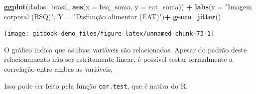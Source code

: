 \documentclass[
]{book}
\newenvironment{Shaded}{\begin{snugshade}}{\end{snugshade}}
\newcommand{\DataTypeTok}[1]{\textcolor[rgb]{0.13,0.29,0.53}{#1}}
\newcommand{\KeywordTok}[1]{\textcolor[rgb]{0.13,0.29,0.53}{\textbf{#1}}}
\newcommand{\NormalTok}[1]{#1}
\newcommand{\OperatorTok}[1]{\textcolor[rgb]{0.81,0.36,0.00}{\textbf{#1}}}
\newcommand{\StringTok}[1]{\textcolor[rgb]{0.31,0.60,0.02}{#1}}
\begin{document}
\begin{Shaded}
\begin{Highlighting}[]
\KeywordTok{ggplot}\NormalTok{(dados_brasil, }\KeywordTok{aes}\NormalTok{(}\DataTypeTok{x =}\NormalTok{ bsq_soma, }\DataTypeTok{y =}\NormalTok{ eat_soma)) }\OperatorTok{+}
\StringTok{  }\KeywordTok{labs}\NormalTok{(}\DataTypeTok{x =} \StringTok{"Imagem corporal (BSQ)"}\NormalTok{, }\DataTypeTok{Y =} \StringTok{"Disfunção alimentar (EAT)"}\NormalTok{)}\OperatorTok{+}
\StringTok{  }\KeywordTok{geom_jitter}\NormalTok{()}
\end{Highlighting}
\end{Shaded}

\begin{center}\texttt{[image: gitbook-demo\_files/figure-latex/unnamed-chunk-73-1]} \end{center}

O gráfico indica que as duas variáveis são relacionadas. Apesar do padrão deste relacionamento não ser estritamente linear, é possível testar formalmente a correlação entre ambas as variáveis,

Isso pode ser feito pela função \texttt{cor.test}, que é nativa do R.

\begin{Shaded}
\end{Shaded}
\end{document}
